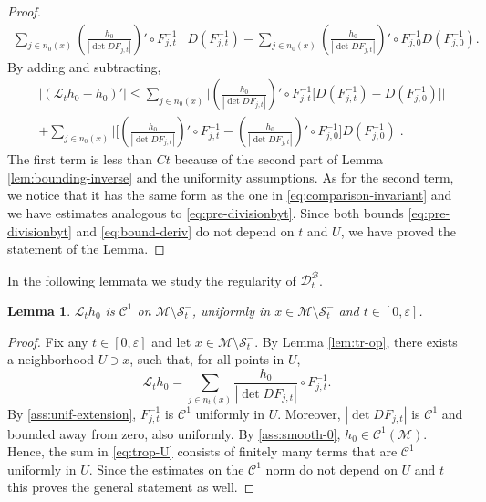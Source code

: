 \documentclass{amsart}
\numberwithin{equation}{section}
\newtheorem{lemma}[theorem]{Lemma}
\newcommand\ve{\varepsilon}
\renewcommand{\le}{\leqslant}
\newcommand\cB{{\mathcal B}}
\newcommand\cC{{\mathcal C}}
\newcommand\cL{{\mathcal L}}
\newcommand\cM{{\mathcal M}}
\newcommand\cS{{\mathcal S}}
\newcommand{\Deriv}{\mathcal D}
\begin{document}
\begin{proof}
\[
\begin{split}
\sum_{j \in n_0(x)}  \left(\frac{h_0}{|\det DF_{j,t}|}\right)' \circ F_{j,t}^{-1}&  D(F^{-1}_{j,t}) - \sum_{j \in n_0(x)}  \left(\frac{h_0}{|\det DF_{j,t}|}\right)' \circ F_{j,0}^{-1}  D(F^{-1}_{j,0}).
\end{split}
\]
By adding and subtracting,
\begin{equation}\label{eq:bound-deriv}
    \begin{split}
&|(\cL_t h_0  - h_0 )'| \le \sum_{j \in n_0(x)} \biggl| \left(\frac{h_0}{|\det DF_{j,t}|}\right)' \circ F_{j,t}^{-1} \bigl[  D(F^{-1}_{j,t}) - D(F^{-1}_{j,0}) \bigr]\biggr|\\
& + \sum_{j \in n_0(x)} \biggl|\biggl[  \left(\frac{h_0}{|\det DF_{j,t}|}\right)' \circ F_{j,t}^{-1}  -  \left(\frac{h_0}{|\det DF_{j,t}|}\right)' \circ F_{j,0}^{-1}  \biggr] D(F_{j,0}^{-1})\biggr|.
\end{split}
\end{equation}
The first term is less than \(Ct\) because of the second part of Lemma \ref{lem:bounding-inverse} and the uniformity assumptions. As for the second term, we notice that it has the same form as the one in \eqref{eq:comparison-invariant} and we have estimates analogous to \eqref{eq:pre-divisionbyt}. Since both bounds \eqref{eq:pre-divisionbyt} and \eqref{eq:bound-deriv} do not depend on \(t\) and \(U\), we have proved the statement of the Lemma.
\end{proof}
In the following lemmata we study the regularity of \(\Deriv_t^{\cB}\).
\begin{lemma}
\label{lem:regularity}
\(\cL_t h_0\) is \(\cC^1\) on \(\cM \setminus \cS_t^{-}\), uniformly in  \(x \in \cM \setminus \cS_t^{-}\) and \(t \in [0,\ve]\).
\end{lemma}
\begin{proof}
Fix any \(t \in [0,\ve]\) and let \(x \in \cM \setminus \cS_t^{-}\). By Lemma \ref{lem:tr-op}, there exists a neighborhood \(U \ni x\), such that, for all points in \(U\),
\begin{equation}
  \label{eq:trop-U}
\cL_t h_0 = \sum_{j \in n_t(x)} \frac{h_0}{\left|\det DF_{j,t} \right|}\circ F_{j,t}^{-1}.
\end{equation}
 By \ref{ass:unif-extension}, \(F_{j,t}^{-1}\) is \(\cC^1\) uniformly in \(U\). Moreover, \(\left|\det DF_{j,t}\right|\) is \(\cC^1\) and bounded away from zero, also uniformly. By \ref{ass:smooth-0}, \(h_0 \in \cC^1 (\cM)\). Hence, the sum in \eqref{eq:trop-U} consists of finitely many terms that are \(\cC^1\) uniformly in \(U\). Since the estimates on the \(\cC^1\) norm do not depend on \(U\) and \(t\) this proves the general statement as well.
\end{proof}
\end{document}
